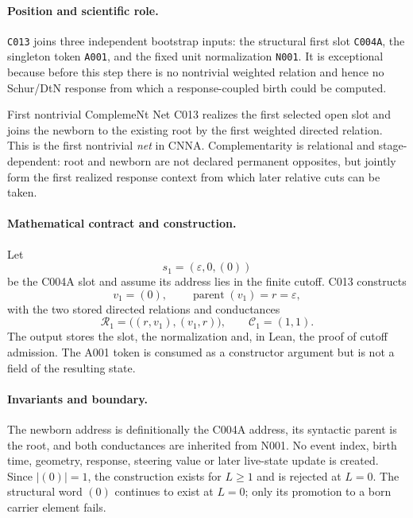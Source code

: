 
\paragraph*{Position and scientific role.}
\texttt{C013} joins three independent bootstrap inputs: the structural first
slot \texttt{C004A}, the singleton token \texttt{A001}, and the fixed unit
normalization \texttt{N001}.  It is exceptional because before this step there
is no nontrivial weighted relation and hence no Schur/DtN response from which a
response-coupled birth could be computed.

\begin{cnnaInfoBox}{First nontrivial ComplemeNt Net}
C013 realizes the first selected open slot and joins the newborn to the existing root by the first weighted directed relation.  This is the first nontrivial \emph{net} in CNNA.  Complementarity is relational and stage-dependent: root and newborn are not declared permanent opposites, but jointly form the first realized response context from which later relative cuts can be taken.
\end{cnnaInfoBox}

\paragraph*{Mathematical contract and construction.}
Let
\begin{equation}
  s_1=(\varepsilon,0,(0))
\end{equation}
be the C004A slot and assume its address lies in the finite cutoff.  C013
constructs
\begin{equation}
  v_1=(0),\qquad \operatorname{parent}(v_1)=r=\varepsilon,
\end{equation}
with the two stored directed relations and conductances
\begin{equation}
  \mathcal R_1=
  \bigl((r,v_1),(v_1,r)\bigr),
  \qquad
  \mathcal C_1=(1,1).
  \label{eq:c013-first-birth}
\end{equation}
The output stores the slot, the normalization and, in Lean, the proof of cutoff
admission.  The A001 token is consumed as a constructor argument but is not a
field of the resulting state.

\paragraph*{Invariants and boundary.}
The newborn address is definitionally the C004A address, its syntactic parent
is the root, and both conductances are inherited from N001.  No event index,
birth time, geometry, response, steering value or later live-state update is
created.  Since $|(0)|=1$, the construction exists for $L\ge1$ and is rejected
at $L=0$.  The structural word $(0)$ continues to exist at $L=0$; only its
promotion to a born carrier element fails.

